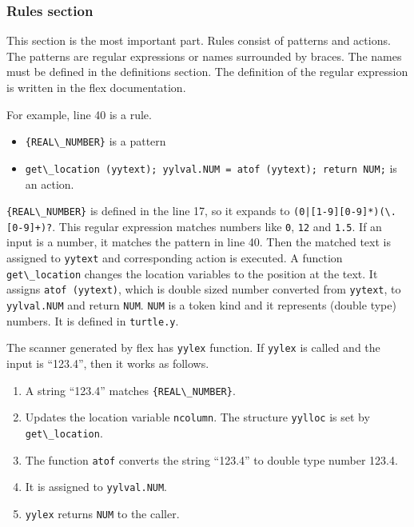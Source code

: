 \subsubsection{Rules section}\label{rules-section}

This section is the most important part. Rules consist of patterns and
actions. The patterns are regular expressions or names surrounded by
braces. The names must be defined in the definitions section. The
definition of the regular expression is written in the flex
documentation.

For example, line 40 is a rule.

\begin{itemize}
\tightlist
\item
  \passthrough{\lstinline!\{REAL\_NUMBER\}!} is a pattern
\item
  \passthrough{\lstinline!get\_location (yytext); yylval.NUM = atof (yytext); return NUM;!}
  is an action.
\end{itemize}

\passthrough{\lstinline!\{REAL\_NUMBER\}!} is defined in the line 17, so
it expands to \passthrough{\lstinline!(0|[1-9][0-9]*)(\\.[0-9]+)?!}.
This regular expression matches numbers like
\passthrough{\lstinline!0!}, \passthrough{\lstinline!12!} and
\passthrough{\lstinline!1.5!}. If an input is a number, it matches the
pattern in line 40. Then the matched text is assigned to
\passthrough{\lstinline!yytext!} and corresponding action is executed. A
function \passthrough{\lstinline!get\_location!} changes the location
variables to the position at the text. It assigns
\passthrough{\lstinline!atof (yytext)!}, which is double sized number
converted from \passthrough{\lstinline!yytext!}, to
\passthrough{\lstinline!yylval.NUM!} and return
\passthrough{\lstinline!NUM!}. \passthrough{\lstinline!NUM!} is a token
kind and it represents (double type) numbers. It is defined in
\passthrough{\lstinline!turtle.y!}.

The scanner generated by flex has \passthrough{\lstinline!yylex!}
function. If \passthrough{\lstinline!yylex!} is called and the input is
``123.4'', then it works as follows.

\begin{enumerate}
\def\labelenumi{\arabic{enumi}.}
\tightlist
\item
  A string ``123.4'' matches \passthrough{\lstinline!\{REAL\_NUMBER\}!}.
\item
  Updates the location variable \passthrough{\lstinline!ncolumn!}. The
  structure \passthrough{\lstinline!yylloc!} is set by
  \passthrough{\lstinline!get\_location!}.
\item
  The function \passthrough{\lstinline!atof!} converts the string
  ``123.4'' to double type number 123.4.
\item
  It is assigned to \passthrough{\lstinline!yylval.NUM!}.
\item
  \passthrough{\lstinline!yylex!} returns \passthrough{\lstinline!NUM!}
  to the caller.
\end{enumerate}

